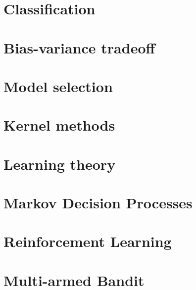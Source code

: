 \documentclass[12pt, a4paper]{report}
\begin{document}
    \chapter{Classification}
    
    
    
    
    
    
    

    \chapter{Bias-variance tradeoff}
    
    
    

    \chapter{Model selection}
    
    
    

    \chapter{Kernel methods}
    
    
    

    \chapter{Learning theory}




    \chapter{Markov Decision Processes}
    



    \chapter{Reinforcement Learning}


    \chapter{Multi-armed Bandit}



    
\end{document}
